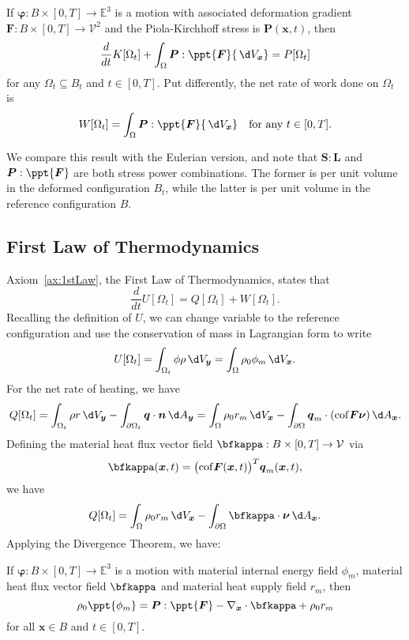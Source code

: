 \documentclass[
  letterpaper,
  DIV=11,
  numbers=noendperiod]{scrreprt}
\theoremstyle{plain}
\theoremstyle{remark}
\begin{document}
If \({\boldsymbol{\varphi}}:B\times[0,T]\to{\mathbb{E}}^3\) is a motion
with associated deformation gradient
\({\boldsymbol{F}}:B\times[0,T]\to{\mathcal{V}}^2\) and the
Piola-Kirchhoff stress is \({\boldsymbol{P}}({\boldsymbol{x}},t)\), then
\[\frac{d}{dt}K[\Omega_t] +\int_\Omega {\boldsymbol{P}}:\ppt{\boldsymbol{F}}{\,\d V_{{\boldsymbol{x}}}}= P[\Omega_t]\]
for any \(\Omega_t\subseteq B_t\) and \(t\in[0,T]\). Put differently,
the net rate of work done on \(\Omega_t\) is
\[W[\Omega_t] = \int_\Omega {\boldsymbol{P}}:\ppt{\boldsymbol{F}}{\,\d V_{{\boldsymbol{x}}}}\quad\text{for any }t\in[0,T].\]

We compare this result with the Eulerian version, and note that
\({\boldsymbol{S}}:{\boldsymbol{L}}\) and
\({\boldsymbol{P}}:\ppt{\boldsymbol{F}}\) are both stress power
combinations. The former is per unit volume in the deformed
configuration \(B_t\), while the latter is per unit volume in the
reference configuration \(B\).

\subsection{First Law of
Thermodynamics}\label{first-law-of-thermodynamics-1}

Axiom~\hyperref[ax:1stLaw]{{[}ax:1stLaw{]}}, the First Law of
Thermodynamics, states that
\[\frac{d}{dt}U[\Omega_t] = Q[\Omega_t]+W[\Omega_t].\] Recalling the
definition of \(U\), we can change variable to the reference
configuration and use the conservation of mass in Lagrangian form to
write
\[U[\Omega_t] = \int_{\Omega_t}\phi\rho {\,\d V_{{\boldsymbol{y}}}}= \int_{\Omega} \rho_0\phi_m{\,\d V_{{\boldsymbol{x}}}}.\]
For the net rate of heating, we have
\[Q[\Omega_t] = \int_{\Omega_t}\rho r {\,\d V_{{\boldsymbol{y}}}}-\int_{\partial\Omega_t}{\boldsymbol{q}}\cdot{\boldsymbol{n}}{\,\d A_{{\boldsymbol{y}}}}= \int_\Omega\rho_0r_m{\,\d V_{{\boldsymbol{x}}}}-\int_{\partial \Omega}{\boldsymbol{q}}_m\cdot({\operatorname{cof}}{\boldsymbol{F}}{\boldsymbol{\nu}}){\,\d A_{{\boldsymbol{x}}}}.\]
Defining the material heat flux vector field
\(\bfkappa:B\times[0,T]\to{\mathcal{V}}\) via
\[\bfkappa({\boldsymbol{x}},t) = \big({\operatorname{cof}}{\boldsymbol{F}}({\boldsymbol{x}},t)\big)^T{\boldsymbol{q}}_m({\boldsymbol{x}},t),\]
we have
\[Q[\Omega_t] = \int_\Omega\rho_0r_m{\,\d V_{{\boldsymbol{x}}}}-\int_{\partial \Omega}\bfkappa\cdot{\boldsymbol{\nu}}{\,\d A_{{\boldsymbol{x}}}}.\]
Applying the Divergence Theorem, we have:

If \({\boldsymbol{\varphi}}:B\times[0,T]\to{\mathbb{E}}^3\) is a motion
with material internal energy field \(\phi_m\), material heat flux
vector field \(\bfkappa\) and material heat supply field \(r_m\), then
\[\rho_0\ppt{\phi_m} = {\boldsymbol{P}}:\ppt{\boldsymbol{F}}-\nabla_{\boldsymbol{x}}\cdot\bfkappa+\rho_0r_m\]
for all \({\boldsymbol{x}}\in B\) and \(t\in[0,T]\).
\end{document}
